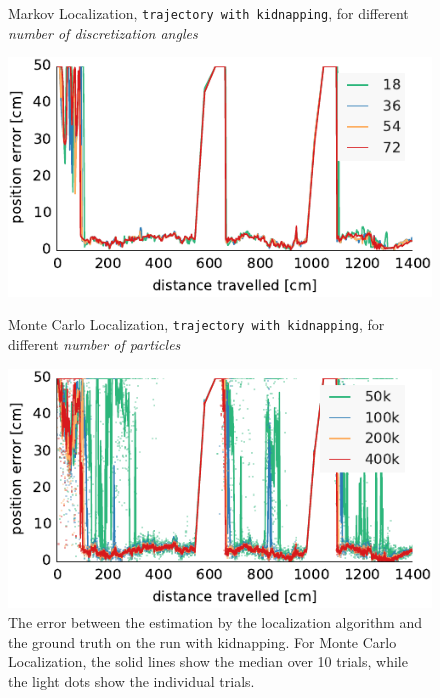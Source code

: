 \documentclass[letterpaper, 10pt, conference]{ieeeconf}
\begin{document}
\begin{figure}

\begin{center}
Markov Localization, \texttt{trajectory with kidnapping}, for different \emph{number of discretization angles}
\end{center}
\includegraphics{ml-whole_random_long-xy}

\vspace{.5em}

\begin{center}
Monte Carlo Localization, \texttt{trajectory with kidnapping}, for different \emph{number of particles}
\end{center}
\includegraphics{mcl-whole_random_long-xy}

\caption{The error between the estimation by the localization algorithm and the ground truth on the run with kidnapping.
For Monte Carlo Localization, the solid lines show the median over 10 trials, while the light dots show the individual trials.}
\label{fig:whole-runs-random-long}
\end{figure}
\end{document}
